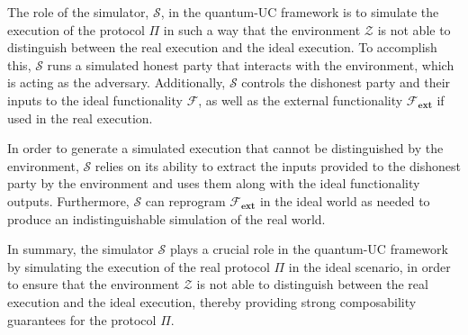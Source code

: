 The role of the simulator, $\mathcal{S}$, in the quantum-UC framework is to simulate the execution of the protocol $\Pi$ in such a way that the environment $\mathcal{Z}$ is not able to distinguish between the real execution and the ideal execution. To accomplish this, $\mathcal{S}$ runs a simulated honest party that interacts with the environment, which is acting as the adversary. Additionally, $\mathcal{S}$ controls the dishonest party and their inputs to the ideal functionality $\mathcal{F}$, as well as the external functionality $\mathcal{F}_{\textbf{ext}}$ if used in the real execution.

In order to generate a simulated execution that cannot be distinguished by the environment, $\mathcal{S}$ relies on its ability to extract the inputs provided to the dishonest party by the environment and uses them along with the ideal functionality outputs. Furthermore, $\mathcal{S}$ can reprogram $\mathcal{F}_{\textbf{ext}}$ in the ideal world as needed to produce an indistinguishable simulation of the real world.

In summary, the simulator $\mathcal{S}$ plays a crucial role in the quantum-UC framework by simulating the execution of the real protocol $\Pi$ in the ideal scenario, in order to ensure that the environment $\mathcal{Z}$ is not able to distinguish between the real execution and the ideal execution, thereby providing strong composability guarantees for the protocol $\Pi$.




 


